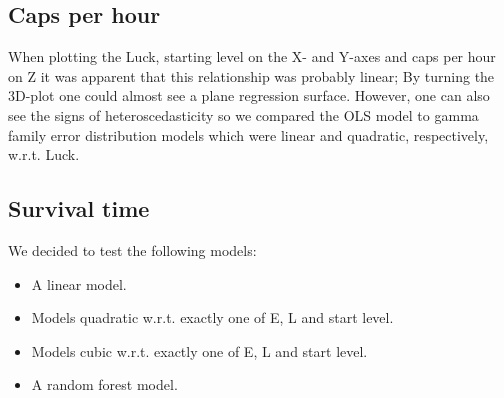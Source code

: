 \subsection{Caps per hour}
When plotting the Luck, starting level on the X- and Y-axes and caps per hour on Z it was apparent that this relationship was probably linear; By turning the 3D-plot one could almost see a plane regression surface. However, one can also see the signs of heteroscedasticity so we compared the OLS model to gamma family error distribution models which were linear and quadratic, respectively, w.r.t. Luck. 

\subsection{Survival time}
We decided to test the following models:
\begin{itemize}
\item A linear model.
\item Models quadratic w.r.t. exactly one of E, L and start level.
\item Models cubic w.r.t. exactly one of E, L and start level.
\item A random forest model.
\end{itemize}